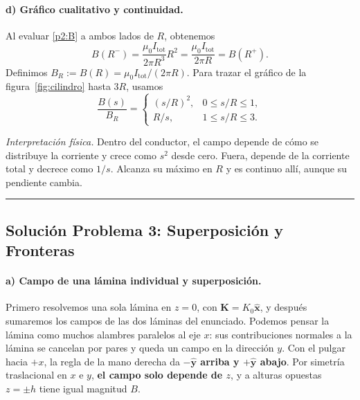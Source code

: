 \documentclass[11pt]{article}
\newcommand{\ex}{\hat{\mathbf{x}}}
\newcommand{\ey}{\hat{\mathbf{y}}}
\newcommand{\ideafisica}[1]{%
  \par\medskip\noindent\textit{Interpretación física.} #1\par}
\begin{document}
\paragraph{d) Gráfico cualitativo y continuidad.}
Al evaluar \eqref{p2:B} a ambos lados de $R$, obtenemos
\[
  B(R^-)
    =\frac{\mu_0I_{\mathrm{tot}}}{2\pi R^3}R^2
    =\frac{\mu_0I_{\mathrm{tot}}}{2\pi R}
    =B(R^+).
\]
Definimos $B_R:=B(R)=\mu_0I_{\mathrm{tot}}/(2\pi R)$.
Para trazar el gráfico de la figura~\ref{fig:cilindro} hasta $3R$,
usamos
\[
  \frac{B(s)}{B_R}
    =\begin{cases}
       (s/R)^2,&0\leq s/R\leq1,\\[3pt]
       R/s,&1\leq s/R\leq3.
     \end{cases}
\]
\ideafisica{Dentro del conductor, el campo depende de cómo se
distribuye la corriente y crece como $s^2$ desde cero. Fuera,
depende de la corriente total y decrece como $1/s$. Alcanza su
máximo en $R$ y es continuo allí, aunque su pendiente cambia.}

\par\bigskip\hrule\bigskip
\subsection*{Solución Problema 3: Superposición y Fronteras}

\paragraph{a) Campo de una lámina individual y superposición.}
Primero resolvemos una sola lámina en $z=0$, con
$\mathbf K=K_0\ex$, y después sumaremos los campos de las dos
láminas del enunciado. Podemos pensar la lámina como muchos alambres
paralelos al eje $x$: sus contribuciones normales a la lámina se
cancelan por pares y queda un campo en la dirección $y$.
Con el pulgar hacia $+x$, la regla de la mano derecha da
\textbf{$-\ey$ arriba y $+\ey$ abajo}.
Por simetría traslacional en $x$ e $y$, \textbf{el campo solo depende
de $z$}, y a alturas opuestas $z=\pm h$ tiene igual magnitud $B$.
\end{document}
